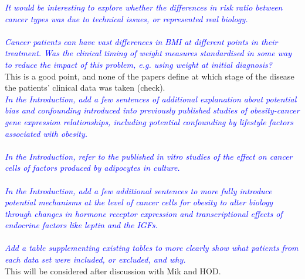 \documentclass[a4paper, 12pt]{article}
\begin{document}
\noindent
\textcolor{blue}{
	\textit{It would be interesting to explore whether the differences in risk ratio between cancer types was due to technical issues, or represented real biology.
	}
}\\

\noindent
\\

\noindent
\textcolor{blue}{
	\textit{Cancer patients can have vast differences in BMI at different points in their treatment.
	Was the clinical timing of weight measures standardised in some way to reduce the impact of this problem, e.g. using weight at initial diagnosis?
	}
}\\

\noindent
This is a good point, and none of the papers define at which stage of the disease the patients' clinical data was taken (check).
\\

\noindent
\textcolor{blue}{
	\textit{In the Introduction, add a few sentences of additional explanation about potential bias and confounding introduced into previously published studies of obesity-cancer gene expression relationships, including potential confounding by lifestyle factors associated with obesity.
	}
}\\

\noindent
\\

\noindent
\textcolor{blue}{
	\textit{In the Introduction, refer to the published in vitro studies of the effect on cancer cells of factors produced by adipocytes in culture.
	}
}\\

\noindent
\\

\noindent
\textcolor{blue}{
	\textit{In the Introduction, add a few additional sentences to more fully introduce potential mechanisms at the level of cancer cells for obesity to alter biology through changes in hormone receptor expression and transcriptional effects of endocrine factors like leptin and the IGFs.
	}
}\\

\noindent
\\

\noindent
\textcolor{blue}{
	\textit{Add a table supplementing existing tables to more clearly show what patients from each data set were included, or excluded, and why.
	}
}\\

\noindent
This will be considered after discussion with Mik and HOD.
\\
\end{document}
